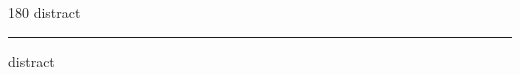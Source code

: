 
\begin{frame}
\begin{center}
\begin{turn}{180}
{\fontsize{2.5cm}{1em}\selectfont distract}
\end{turn}
\vspace{1em}\par  
\hrule
\vspace{1em}\par  
{\fontsize{2.5cm}{1em}\selectfont distract}
\end{center}
\end{frame}
